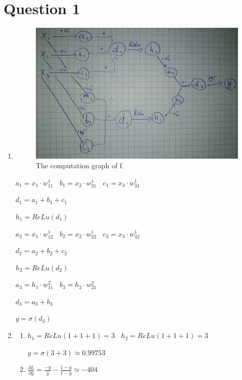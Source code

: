 \documentclass{article}
\begin{document}
\section*{Question 1} 
\begin{enumerate}[label = (\alph*)]
    \item
    
\begin{figure}[h!]
    \centering
    \includegraphics[scale=1.5]{figures/backprop.jpg}
    \caption{The computation graph of f.}
    \label{fig:roller-coaster}
\end{figure}

$a_1 = x_1 \cdot w_{11}^1 \; \;$
$b_1 = x_2 \cdot w_{21}^1 \; \;$
$c_1 = x_3 \cdot w_{31}^1 \; \;$

$d_1=a_1 + b_1 + c_1$

$h_1 = ReLu(d_1)$

$a_2 = x_1 \cdot w_{12}^1 \; \;$
$b_2 = x_2 \cdot w_{22}^1 \; \;$
$c_2 = x_3 \cdot w_{32}^1 \; \;$

$d_2=a_2 + b_2 + c_2$

$h_2 = ReLu(d_2)$

$a_3 = h_1 \cdot w_{11}^2 \; \;$
$b_3 = h_2 \cdot w_{21}^2 \; \;$

$d_3=a_3 + b_3$

$y=\sigma(d_3)$

\item 
	\begin{enumerate}[label = (\roman*)]
		\item
		$h_1=ReLu(1+1+1) = 3 \; \;$
		$h_2=ReLu(1+1+1) = 3 $
		
		$y=\sigma(3+3) \simeq 0.99753$
		
		\item
		$\frac{\partial L}{\partial \hat{y}} = \frac{-y}{\hat{y}}-\frac{1-y}{1-\hat{y}}\simeq -404 \; \; \;$ 
		

\end{enumerate}
\end{enumerate}
\end{document}
